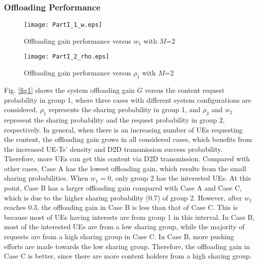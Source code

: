 \documentclass[12pt, draftclsnofoot, onecolumn]{IEEEtran}
\begin{document}
\subsubsection{Offloading Performance}

\begin{figure}
\begin{minipage}[t]{0.5\textwidth}
\centering
\texttt{[image: PartI\_1\_w.eps]}
\caption{Offloading gain performance versus $w_1$ with $M$=2}
\label{fig1}
\end{minipage}
\begin{minipage}[t]{0.5\textwidth}
\centering
\texttt{[image: PartI\_2\_rho.eps]}
\caption{Offloading gain performance versus $\rho_1$ with $M$=2}
\label{fig2}
\end{minipage}
\end{figure}

Fig. \ref{fig1} shows the system offloading gain $G$ versus the content request probability in group 1, where three cases with different system configurations are considered.
$\rho_1$ represents the sharing probability in group 1, and $\rho_2$ and $w_2$ represent the sharing probability and the request probability in group 2, respectively.
In general, when there is an increasing number of UEs requesting the content, the offloading gain grows in all considered cases, which benefits from the increased UE-Ts' density and D2D transmission success probability. Therefore, more UEs can get this content via D2D transmission.
Compared with other cases, Case A has the lowest offloading gain, which results from the small sharing probabilities. When $w_1 =0$, only group 2 has the interested UEs. At this point, Case B has a larger offloading gain compared with Case A and Case C, which is due to the higher sharing probability (0.7) of group 2. However, after $w_1$ reaches 0.3, the offloading gain in Case B is less than that of Case C. This is because most of UEs having interests are from group 1 in this interval. In Case B, most of the interested UEs are from a low sharing group, while the majority of requests are from a high sharing group in Case C. In Case B, more pushing efforts are made towards the low sharing group. Therefore, the offloading gain in Case C is better, since there are more content holders from a high sharing group.
\end{document}
